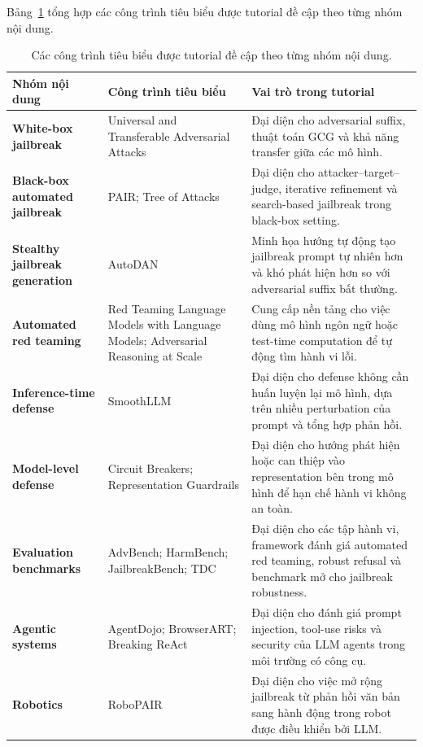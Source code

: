Bảng~\ref{tab:tutorial-paper-groups} tổng hợp các công trình tiêu biểu
được tutorial đề cập theo từng nhóm nội dung.

\begin{table}[H]
\centering
\caption{Các công trình tiêu biểu được tutorial đề cập theo từng nhóm nội dung.}
\label{tab:tutorial-paper-groups}
\begin{tabularx}{\textwidth}{
    >{\bfseries}p{}
    p{}
    X
}
\toprule
Nhóm nội dung
& Công trình tiêu biểu
& Vai trò trong tutorial \\
\midrule

White-box jailbreak
& Universal and Transferable Adversarial Attacks
& Đại diện cho adversarial suffix, thuật toán GCG và khả năng transfer giữa
các mô hình. \\

Black-box automated jailbreak
& PAIR; Tree of Attacks
& Đại diện cho attacker--target--judge, iterative refinement và search-based
jailbreak trong black-box setting. \\

Stealthy jailbreak generation
& AutoDAN
& Minh họa hướng tự động tạo jailbreak prompt tự nhiên hơn và khó phát hiện
hơn so với adversarial suffix bất thường. \\

Automated red teaming
& Red Teaming Language Models with Language Models; Adversarial Reasoning
at Scale
& Cung cấp nền tảng cho việc dùng mô hình ngôn ngữ hoặc test-time
computation để tự động tìm hành vi lỗi. \\

Inference-time defense
& SmoothLLM
& Đại diện cho defense không cần huấn luyện lại mô hình, dựa trên nhiều
perturbation của prompt và tổng hợp phản hồi. \\

Model-level defense
& Circuit Breakers; Representation Guardrails
& Đại diện cho hướng phát hiện hoặc can thiệp vào representation bên trong
mô hình để hạn chế hành vi không an toàn. \\

Evaluation benchmarks
& AdvBench; HarmBench; JailbreakBench; TDC
& Đại diện cho các tập hành vi, framework đánh giá automated red teaming,
robust refusal và benchmark mở cho jailbreak robustness. \\

Agentic systems
& AgentDojo; BrowserART; Breaking ReAct
& Đại diện cho đánh giá prompt injection, tool-use risks và security của
LLM agents trong môi trường có công cụ. \\

Robotics
& RoboPAIR
& Đại diện cho việc mở rộng jailbreak từ phản hồi văn bản sang hành động
trong robot được điều khiển bởi LLM. \\

\bottomrule
\end{tabularx}
\end{table}

